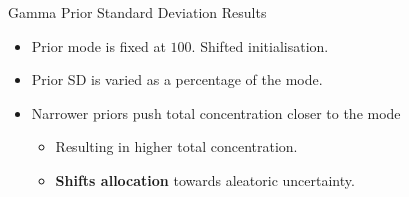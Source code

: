 \begin{frame}{Gamma Prior Standard Deviation Results}
\label{frm:backup-prior-sd}
\begin{itemize}
\item Prior mode is fixed at $100$. Shifted initialisation. 
\item Prior SD is varied as a percentage of the mode.
\item Narrower priors push total concentration closer to the mode 
\begin{itemize}
\item Resulting in higher total concentration.
\item \textbf{Shifts allocation} towards aleatoric uncertainty.
\end{itemize}
\end{itemize}
\end{frame}


